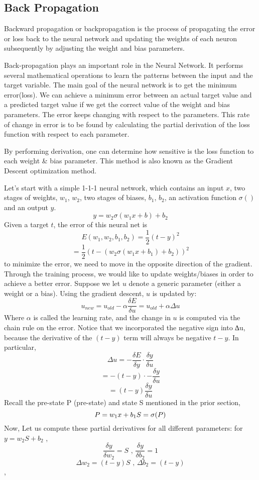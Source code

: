 \subsection{Back Propagation}
Backward propagation or backpropagation is the process of propagating the error or loss back to the neural network and updating the weights of each neuron subsequently by adjusting the weight and bias parameters.

Back-propagation plays an important role in the Neural Network. It performs several mathematical operations to learn the patterns between the input and the target variable.
The main goal of the neural network is to get the minimum error(loss). We can achieve a minimum error between an actual target value and a predicted target value if we get the correct value of the weight and bias parameters.
The error keeps changing with respect to the parameters. This rate of change in error is to be found by calculating the partial derivation of the loss function with respect to each parameter.

By performing derivation, one can determine how sensitive is the loss function to each weight & bias parameter. This method is also known as the Gradient Descent optimization method.

Let's start with a simple 1-1-1 neural network, which contains an input $x$, two stages of weights, $w_{1}$, $w_{2}$, two stages of biases, $b_{1}$, $b_{2}$, an activation function $\sigma()$ and an output $y$.
$$y = w_{2}\sigma(w_{1}x+b)+b_{2}$$
Given a target $t$, the error of this neural net is $$ E(w_{1},w_{2},b_{1},b_{2}) =\frac{1}{2}(t-y)^{2}$$
$$ = \frac{1}{2}(t- (w_{2}\sigma(w_{1}x+b_{1})+b_{2}))^{2}$$ 
to minimize the error, we need to move in the opposite direction of the gradient. Through the training process, we would like to update weights/biases in order to achieve a better error. Suppose we let $u$ denote a generic parameter (either a weight or a bias). Using the gradient descent, $u$ is updated by:
$$u_{new} = u_{old}-\alpha\frac{\delta E}{\delta u} = u_{old}+ \alpha\Delta u$$
Where $\alpha$ is called the learning rate, and the change in $u$ is computed via the chain rule on the error. Notice that we incorporated the negative sign into ∆u, because the derivative of the $(t − y)$ term will always be negative $t − y$. In particular,
$$\Delta u = - \frac{\delta E}{\delta y}\cdot\frac{\delta y}{\delta u}$$
$$ = -(t-y)\cdot - \frac{\delta y}{\delta u}$$
$$ = (t-y)\frac{\delta y}{\delta u}$$
Recall the pre-state P (pre-state) and state S mentioned in the prior section,
$$ P = w_{1}x + b_{1} \space S=\sigma(P)$$
Now, Let us compute these partial derivatives for all different parameters:
for $y= w_{2}S+b_{2}$ ,
$$ \frac{\delta y}{\delta w_{2}} = S \text{  , } \frac{\delta y}{\delta b_{2}} = 1$$
$$ \Delta w_{2} = (t-y)S \text{   , }\Delta b_{2} = (t-y)$$,

